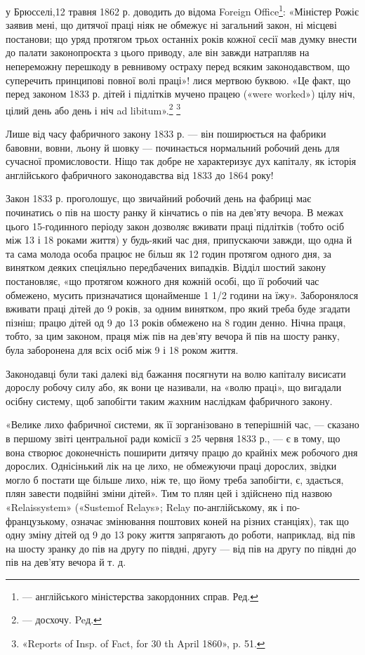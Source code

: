 у Брюсселі,12 травня 1862 р. доводить до відома Foreign Office\footnote*{
— англійського міністерства закордонних справ. Ред.
}: «Міністер
Рожіє заявив мені, що дитячої праці ніяк не обмежує ні загальний закон,
ні місцеві постанови; що уряд протягом трьох останніх років кожної сесії
мав думку внести до палати законопроєкта з цього приводу, але він завжди
натрапляв на непереможну перешкоду в ревнивому остраху перед
всяким законодавством, що суперечить принципові повної волі праці»!
лися мертвою буквою. «Це факт, що перед законом 1833 р. дітей
і підлітків мучено працею («were worked») цілу ніч, цілий день
або день і ніч ad libitum».\footnote*{
— досхочу. Peд.
} \footnote{
«Reports of Insp. of Fact, for 30 th April 1860», p. 51.
}

Лише від часу фабричного закону 1833 р. — він поширюється
на фабрики бавовни, вовни, льону й шовку — починається нормальний
робочий день для сучасної промисловости. Ніщо так
добре не характеризує дух капіталу, як історія англійського
фабричного законодавства від 1833 до 1864 року!

Закон 1833 р. проголошує, що звичайний робочий день на
фабриці має починатись о пів на шосту ранку й кінчатись о пів
на дев’яту вечора. В межах цього 15-годинного періоду закон
дозволяє вживати праці підлітків (тобто осіб між 13 і 18 роками
життя) у будь-який час дня, припускаючи завжди, що одна й
та сама молода особа працює не більш як 12 годин протягом одного
дня, за винятком деяких спеціяльно передбачених випадків. Відділ
шостий закону постановляє, «що протягом кожного дня кожній
особі, що її робочий час обмежено, мусить призначатися щонайменше
1 1/2 години на їжу». Заборонялося вживати праці дітей
до 9 років, за одним винятком, про який треба буде згадати пізніш;
працю дітей од 9 до 13 років обмежено на 8 годин денно.
Нічна праця, тобто, за цим законом, праця між пів на дев’яту
вечора й пів на шосту ранку, була заборонена для всіх осіб між
9 і 18 роком життя.

Законодавці були такі далекі від бажання посягнути на волю
капіталу висисати дорослу робочу силу або, як вони це називали,
на «волю праці», що вигадали осібну систему, щоб запобігти
таким жахним наслідкам фабричного закону.

«Велике лихо фабричної системи, як її зорганізовано в теперішній
час, — сказано в першому звіті центральної ради комісії
з 25 червня 1833 р., — є в тому, що вона створює доконечність
поширити дитячу працю до крайніх меж робочого дня дорослих.
Однісінький лік на це лихо, не обмежуючи праці дорослих, звідки
могло б постати ще більше лихо, ніж те, що йому треба запобігти,
є, здається, плян завести подвійні зміни дітей». Тим то плян цей
і здійснено під назвою «Relaissystem» («Sustemof Relays»; Relay
по-англійському, як і по-французькому, означає змінювання
поштових коней на різних станціях), так що одну зміну дітей
од 9 до 13 року життя запрягають до роботи, наприклад, від пів
на шосту зранку до пів на другу по півдні, другу — від пів на другу
по півдні до пів на дев’яту вечора й т. д.

